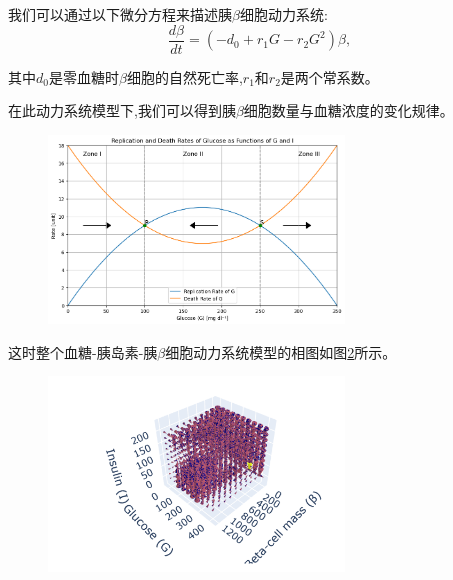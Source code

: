 我们可以通过以下微分方程来描述胰$\beta$细胞动力系统:
\begin{equation}
    \frac{d\beta}{dt} = (-d_0+r_1G-r_2G^2)\beta,
\end{equation}

其中$d_0$是零血糖时$\beta$细胞的自然死亡率,$r_1$和$r_2$是两个常系数\cite{topp2000model}。

在此动力系统模型下,我们可以得到胰$\beta$细胞数量与血糖浓度的变化规律。
\begin{figure}[H]
    \centering
    \includegraphics[width=0.7\textwidth]{Img/betarate.png}
    \label{fig:beta}
\end{figure}

这时整个血糖-胰岛素-胰$\beta$细胞动力系统模型的相图如图\ref{fig:3dphase}所示。
\begin{figure}[H]
    \centering
    \includegraphics[width=0.7\textwidth]{Img/3dphase.png}
    \label{fig:3dphase}
\end{figure}


